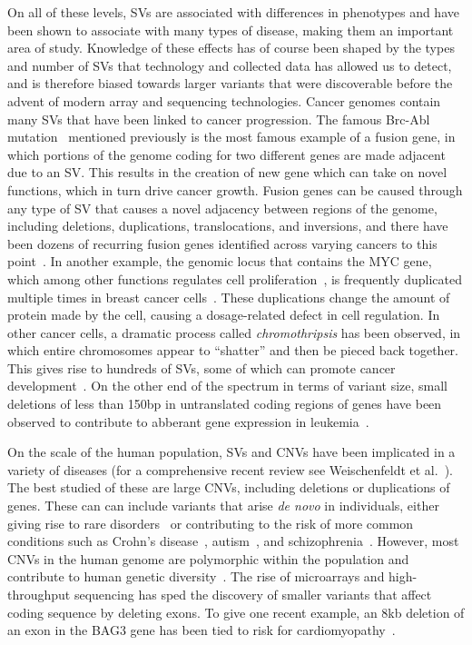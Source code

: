 On all of these levels, SVs are associated with differences in phenotypes and have been shown to associate with many types of disease, making them an important area of study. Knowledge of these effects has of course been shaped by the types and number of SVs that technology and collected data has allowed us to detect, and is therefore biased towards larger variants that were discoverable before the advent of modern array and sequencing technologies. 
Cancer genomes contain many SVs that have been linked to cancer progression. The famous Brc-Abl mutation~\cite{Kurzrock:2003bz} mentioned previously is the most famous example of a fusion gene, in which portions of the genome coding for two different genes are made adjacent due to an SV. This results in the creation of new gene which can take on novel functions, which in turn drive cancer growth. Fusion genes can be caused through any type of SV that causes a novel adjacency between regions of the genome, including deletions, duplications, translocations, and inversions, and there have been dozens of recurring fusion genes identified across varying cancers to this point~\cite{Annala:2013ks}. In another example, the genomic locus that contains the MYC gene, which among other functions regulates cell proliferation~\cite{Eilers:2008jk}, is frequently duplicated multiple times in breast cancer cells~\cite{Escot:1986tn}. These duplications change the amount of protein made by the cell, causing a dosage-related defect in cell regulation. In other cancer cells, a dramatic process called \emph{chromothripsis} has been observed, in which entire chromosomes appear to ``shatter'' and then be pieced back together. This gives rise to hundreds of SVs, some of which can promote cancer development~\cite{Stephens:2011bm}. On the other end of the spectrum in terms of variant size, small deletions of less than 150bp in untranslated coding regions of genes have been observed to contribute to abberant gene expression in leukemia~\cite{Hosokawa:1998wi}.

On the scale of the human population, SVs and CNVs have been implicated in a variety of diseases (for a comprehensive recent review see Weischenfeldt et al.~\cite{Weischenfeldt:2013fm}). The best studied of these are large CNVs, including deletions or duplications of genes. These can can include variants that arise \emph{de novo} in individuals, either giving rise to rare disorders~\cite{Lupski:1998ip} or contributing to the risk of more common conditions such as Crohn's disease~\cite{McCarroll:2008jt}, autism~\cite{Sebat:2007bs}, and schizophrenia~\cite{Walsh:2008kp}. However, most CNVs in the human genome are polymorphic within the population and contribute to human genetic diversity~\cite{McCarroll:2008p265}. The rise of microarrays and high-throughput sequencing has sped the discovery of smaller variants that affect coding sequence by deleting exons. To give one recent example, an 8kb deletion of an exon in the BAG3 gene has been tied to risk for cardiomyopathy~\cite{Norton:2011ev}. 

